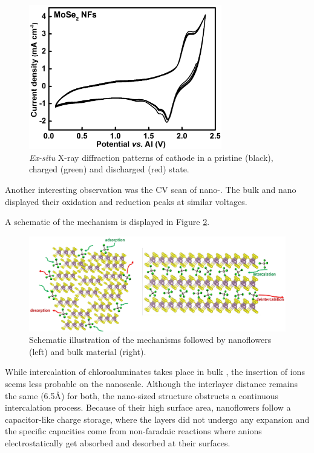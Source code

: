 \begin{figure}[th!]
\centering
\includegraphics[width=0.75\textwidth]{Figures/chap6fig/MoSe2YNCV}
\caption{\textit{Ex-situ} X-ray diffraction patterns of  cathode in a pristine (black), charged (green) and discharged (red) state.}
\label{Figures/chap6fig:MoSe2YNCV}
\end{figure}
Another interesting observation was the CV scan of nano-. The bulk and nano  displayed their oxidation and reduction peaks at similar voltages. 

A schematic of the mechanism is displayed in Figure \ref{Figures/chap6fig:nanbulkmox2}.    

\begin{figure}[h!]
  \centering
  \includegraphics[width=\textwidth]{Figures/chap6fig/nanbulkmox2.pdf}
    \caption{Schematic illustration of the mechanisms followed by  nanoflowers (left) and bulk material (right).}
  \label{Figures/chap6fig:nanbulkmox2}
\end{figure}

While intercalation of chloroaluminates takes place in bulk , the insertion of ions seems less probable on the nanoscale. Although the interlayer distance remains the same (6.5\AA) for both, the nano-sized structure obstructs a continuous intercalation process. Because of their high surface area, nanoflowers follow a capacitor-like charge storage, where the layers did not undergo any expansion and the specific capacities come from non-faradaic reactions where  anions electrostatically get absorbed and desorbed at their surfaces.

